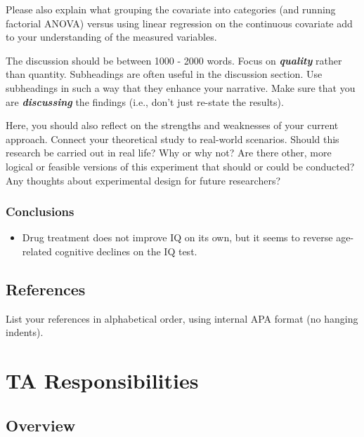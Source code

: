 \documentclass[
]{book}
\providecommand{\tightlist}{%
  \setlength{\itemsep}{0pt}\setlength{\parskip}{0pt}}
\begin{document}
Please also explain what grouping the covariate into categories (and running factorial ANOVA) versus using linear regression on the continuous covariate add to your understanding of the measured variables.

The discussion should be between 1000 - 2000 words. Focus on \textbf{\emph{quality}} rather than quantity. Subheadings are often useful in the discussion section. Use subheadings in such a way that they enhance your narrative. Make sure that you are \textbf{\emph{discussing}} the findings (i.e., don't just re-state the results).

Here, you should also reflect on the strengths and weaknesses of your current approach. Connect your theoretical study to real-world scenarios. Should this research be carried out in real life? Why or why not? Are there other, more logical or feasible versions of this experiment that should or could be conducted? Any thoughts about experimental design for future researchers?

\subsection*{Conclusions}\label{conclusions}

\begin{itemize}
\tightlist
\item
  Drug treatment does not improve IQ on its own, but it seems to reverse age-related cognitive declines on the IQ test.
\end{itemize}

\section*{References}\label{references}

List your references in alphabetical order, using internal APA format (no hanging indents).

\chapter*{TA Responsibilities}\label{ta-responsibilities}

\section*{Overview}\label{overview-2}
\end{document}
